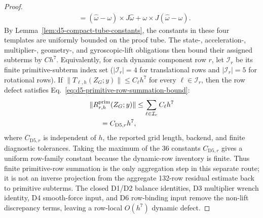 \documentclass[preprint,12pt]{elsarticle}
\begin{document}
\begin{proof}
\begin{equation}
\begin{aligned}
 &=
 (\widehat\omega-\omega)\times J\widehat\omega
 +\omega\times J(\widehat\omega-\omega).
\end{aligned}
\end{equation}
By Lemma~\ref{lem:d5-compact-tube-constants}, the constants in these four
templates are uniformly bounded on the proof tube.  The state-, acceleration-,
multiplier-, geometry-, and gyroscopic-lift obligations then bound their
assigned subterms by \(C h^7\).  Equivalently, for each dynamic component row
\(r\), let \(\mathcal I_r\) be its finite primitive-subterm index set
(\(|\mathcal I_r|=4\) for translational rows and \(|\mathcal I_r|=5\) for
rotational rows).  If
\(\|T_{\ell,h}(Z_G;y)\|\le C_\ell h^7\) for every
\(\ell\in\mathcal I_r\), then the row defect satisfies
Eq.~\eqref{eq:d5-primitive-row-summation-bound}:
\begin{equation}
\label{eq:d5-primitive-row-summation-bound}
\begin{aligned}
  \|R_{r,h}^{\rm prim}(Z_G;y)\|
  &\le \sum_{\ell\in\mathcal I_r} C_\ell h^7\\
  = C_{\mathrm{D5},r}h^7 ,
\end{aligned}
\end{equation}
where \(C_{\mathrm{D5},r}\) is independent of \(h\), the reported grid
length, backend, and finite diagnostic tolerances.  Taking the maximum of the
36 constants \(C_{\mathrm{D5},r}\) gives a uniform row-family constant because
the dynamic-row inventory is finite.  Thus finite primitive-row summation is
the only aggregation step in this separate route; it is not an inverse
projection from the aggregate 132-row residual estimate back to primitive
subterms.  The closed D1/D2 balance identities, D3 multiplier wrench
identity, D4 smooth-force input, and D6 row-binding input remove the non-lift
discrepancy terms, leaving a row-local \(O(h^7)\) dynamic defect.
\end{proof}
\end{document}
